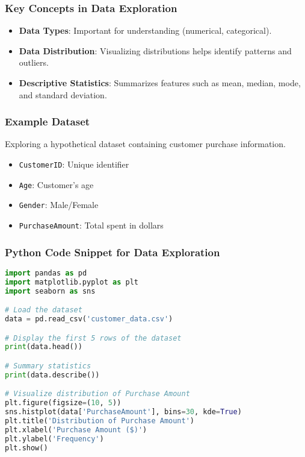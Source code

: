 \documentclass[aspectratio=169]{beamer}
\begin{document}
\begin{frame}
  \frametitle{Key Concepts in Data Exploration}
  \begin{itemize}
    \item \textbf{Data Types}: Important for understanding (numerical, categorical).
    \item \textbf{Data Distribution}: Visualizing distributions helps identify patterns and outliers.
    \item \textbf{Descriptive Statistics}: Summarizes features such as mean, median, mode, and standard deviation.
  \end{itemize}
\end{frame}

\begin{frame}
  \frametitle{Example Dataset}
  Exploring a hypothetical dataset containing customer purchase information.
  \begin{itemize}
    \item \texttt{CustomerID}: Unique identifier
    \item \texttt{Age}: Customer's age
    \item \texttt{Gender}: Male/Female
    \item \texttt{PurchaseAmount}: Total spent in dollars
  \end{itemize}
\end{frame}

\begin{frame}[fragile]
  \frametitle{Python Code Snippet for Data Exploration}
  \begin{lstlisting}[language=Python]
import pandas as pd
import matplotlib.pyplot as plt
import seaborn as sns

# Load the dataset
data = pd.read_csv('customer_data.csv')

# Display the first 5 rows of the dataset
print(data.head())

# Summary statistics
print(data.describe())

# Visualize distribution of Purchase Amount
plt.figure(figsize=(10, 5))
sns.histplot(data['PurchaseAmount'], bins=30, kde=True)
plt.title('Distribution of Purchase Amount')
plt.xlabel('Purchase Amount ($)')
plt.ylabel('Frequency')
plt.show()
  \end{lstlisting}
\end{frame}
\end{document}
